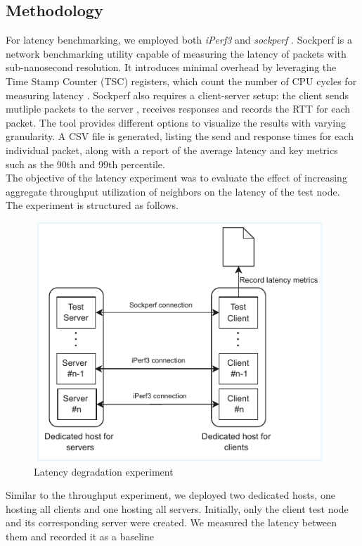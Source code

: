 \subsection{Methodology}
For latency benchmarking, we employed both \textit{iPerf3} and \textit{sockperf} \cite{sockperf}. 
Sockperf is a network benchmarking utility capable of measuring the latency of packets with
sub-nanosecond resolution. It introduces minimal overhead by leveraging the Time Stamp Counter (TSC) 
registers, which count the number of CPU cycles for measuring latency \cite{sockperf}. 
Sockperf also requires a client-server setup: the client sends mutliple packets to the server
, receives responses and records the \ac{RTT} for each packet. 
The tool provides different options to visualize the results with varying granularity. 
A CSV file is generated, listing the send and response times for each individual packet,
along with a report of the average latency and key metrics such as the 90th and 99th percentile. \\
The objective of the latency experiment was to evaluate the effect of increasing aggregate throughput 
utilization of neighbors on the latency of the test node. The experiment is structured as 
follows.
\begin{figure}[H]
  \centering
  \includegraphics[width=11cm, height=9cm]{figures/latexp}
  \caption{Latency degradation experiment}
  \label{fig:latexp}
\end{figure}
\noindent
Similar to the throughput experiment, we deployed two dedicated hosts, 
one hosting all clients and one hosting all servers. Initially, only the client test node 
and its corresponding server were created. We measured the latency between them and recorded it as a baseline 
